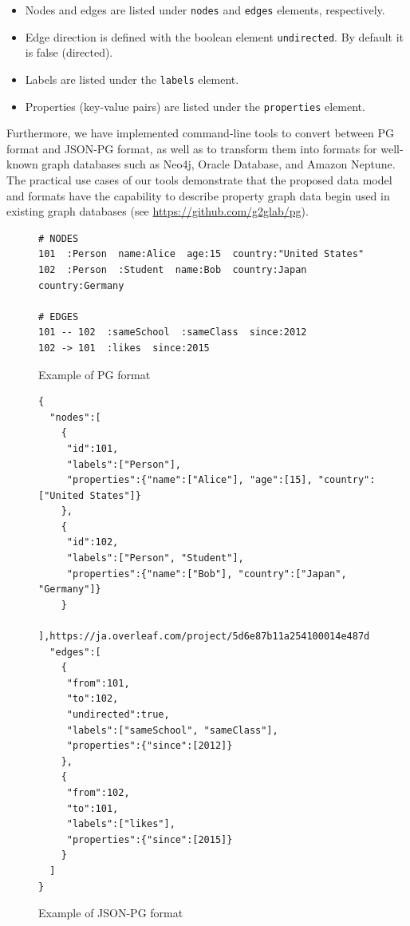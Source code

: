 \documentclass[runningheads]{llncs}
\begin{document}
\begin{itemize}
    \item Nodes and edges are listed under \texttt{nodes} and \texttt{edges} elements, respectively.
    \item Edge direction is defined with the boolean element \texttt{undirected}. By default it is false (directed).
    \item Labels are listed under the \texttt{labels} element.
    \item Properties (key-value pairs) are listed under the \texttt{properties} element.
\end{itemize}

Furthermore, we have implemented command-line tools to convert between PG format and JSON-PG format, as well as to transform them into formats for well-known graph databases such as Neo4j, Oracle Database, and Amazon Neptune. The practical use cases of our tools demonstrate that the proposed data model and formats have the capability to describe property graph data begin used in existing graph databases (see \url{https://github.com/g2glab/pg}).

\begin{figure}[!t]
\begin{scriptsize}
\begin{verbatim}
# NODES
101  :Person  name:Alice  age:15  country:"United States"
102  :Person  :Student  name:Bob  country:Japan  country:Germany

# EDGES
101 -- 102  :sameSchool  :sameClass  since:2012
102 -> 101  :likes  since:2015
\end{verbatim}
\end{scriptsize}
\caption{Example of PG format}
\label{fig:example-pg}
\end{figure}

\begin{figure}[!t]
\begin{scriptsize}
\begin{verbatim}
{
  "nodes":[
    {
     "id":101,
     "labels":["Person"],
     "properties":{"name":["Alice"], "age":[15], "country":["United States"]}
    },
    {
     "id":102,
     "labels":["Person", "Student"],
     "properties":{"name":["Bob"], "country":["Japan", "Germany"]}
    }
  ],https://ja.overleaf.com/project/5d6e87b11a254100014e487d
  "edges":[
    {
     "from":101,
     "to":102,
     "undirected":true,
     "labels":["sameSchool", "sameClass"],
     "properties":{"since":[2012]}
    },
    {
     "from":102,
     "to":101,
     "labels":["likes"],
     "properties":{"since":[2015]}
    }
  ]
}
\end{verbatim}
\end{scriptsize}
\caption{Example of JSON-PG format}
\label{fig:example-json}
\end{figure}
\end{document}
